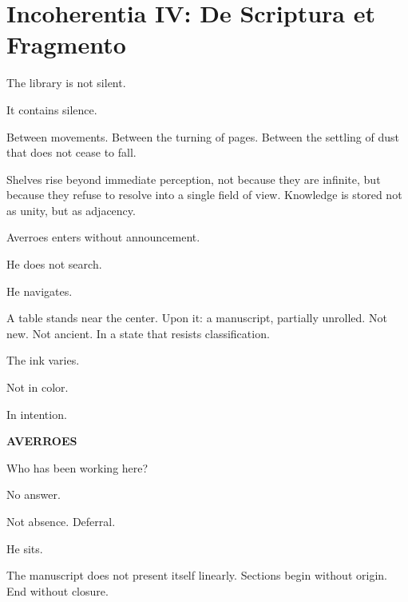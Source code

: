 
\chapter*{Incoherentia IV: De Scriptura et Fragmento}



The library is not silent.

It contains silence.

Between movements. Between the turning of pages. Between the settling of
dust that does not cease to fall.

Shelves rise beyond immediate perception, not because they are infinite, but
because they refuse to resolve into a single field of view. Knowledge is
stored not as unity, but as adjacency.

Averroes enters without announcement.

He does not search.

He navigates.

\medskip

A table stands near the center. Upon it: a manuscript, partially unrolled.
Not new. Not ancient. In a state that resists classification.

The ink varies.

Not in color.

In intention.

\medskip

\textbf{AVERROES}

Who has been working here?

\medskip

No answer.

Not absence. Deferral.

\medskip

He sits.

The manuscript does not present itself linearly. Sections begin without
origin. End without closure.

